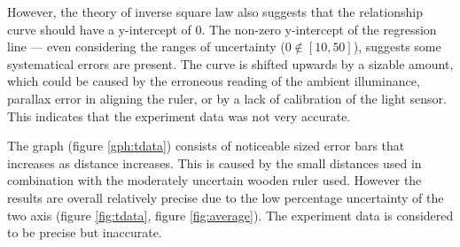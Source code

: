 \documentclass[a4paper,12pt]{article}
\begin{document}
However, the theory of inverse square law also suggests that the relationship curve should have a y-intercept of 0. The non-zero y-intercept of the regression line --- even considering the ranges of uncertainty ($0 \notin [10, 50]$), suggests some systematical errors are present. The curve is shifted upwards by a sizable amount, which could be caused by the erroneous reading of the ambient illuminance, parallax error in aligning the ruler, or by a lack of calibration of the light sensor. This indicates that the experiment data was not very accurate.

The graph (figure \ref{gph:tdata}) consists of noticeable sized error bars that increases as distance increases. This is caused by the small distances used in combination with the moderately uncertain wooden ruler used. However the results are overall relatively precise due to the low percentage uncertainty of the two axis (figure \ref{fig:tdata}, figure \ref{fig:average}). The experiment data is considered to be precise but inaccurate.


\end{document}
